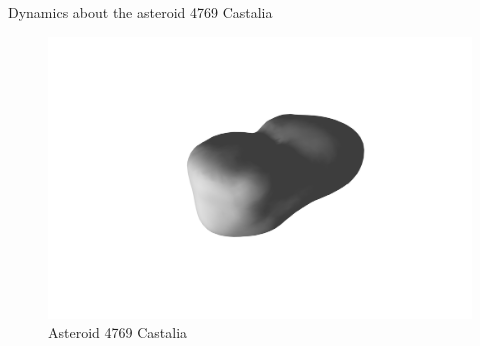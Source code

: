 \documentclass[final, usenames, dvipsnames]{beamer}
\newlength{\twocolwidth}
\begin{document}
\begin{frame}[t]
\begin{columns}[T,onlytextwidth]
\begin{column}{\twocolwidth}
\begin{block}{Dynamics about the asteroid 4769 Castalia}
\begin{minipage}{0.5\columnwidth}
\begin{itemize}
\begin{itemize}
            \end{itemize}
        \end{itemize}
		\begin{figure}
			\includegraphics[trim={8cm 3cm 7cm 3cm},clip,width=0.5\columnwidth]{figures/castalia.pdf}
			\caption*{Asteroid 4769 Castalia}
		\end{figure}
	\end{minipage}%

\end{block} %


\end{column}
\end{columns}
\end{frame}
\end{document}

